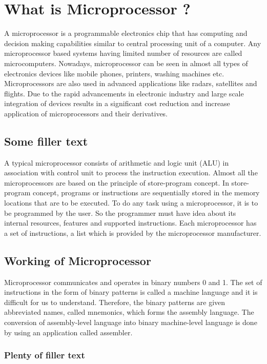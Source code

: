 \documentclass[a4paper,12pt]{book}
\begin{document}
\chapter{What is Microprocessor ?}
A microprocessor is a programmable electronics chip that has computing and decision making capabilities similar to central processing unit of a computer. Any microprocessor based systems having limited number of resources are called microcomputers. Nowadays, microprocessor can be seen in almost all types of electronics devices like mobile phones, printers, washing machines etc. Microprocessors are also used in advanced applications like
radars, satellites and flights. Due to the rapid advancements in electronic industry and large scale integration of devices results in a significant cost reduction and increase application of
microprocessors and their derivatives.
\section{Some filler text}
A typical microprocessor consists of arithmetic and logic unit (ALU) in association with control unit to process the instruction  execution. Almost all the microprocessors are based on the principle of store-program concept. In store-program concept, programs or
instructions are sequentially stored in the memory locations that are to be executed. To do any task using a microprocessor, it is to be programmed by the user. So the programmer must have idea about its internal resources, features and supported instructions. Each
microprocessor has a set of instructions, a list which is provided by the microprocessor manufacturer. 
\section{Working of Microprocessor}
Microprocessor communicates and operates in binary numbers 0 and 1. The set of instructions in the form of binary patterns is called a machine language and it is difficult for us to understand. Therefore, the binary patterns are given abbreviated names, called
mnemonics, which forms the assembly language. The conversion of assembly-level language into binary machine-level language is done by using an application called assembler.

\subsection{Plenty of filler text}
\end{document}

